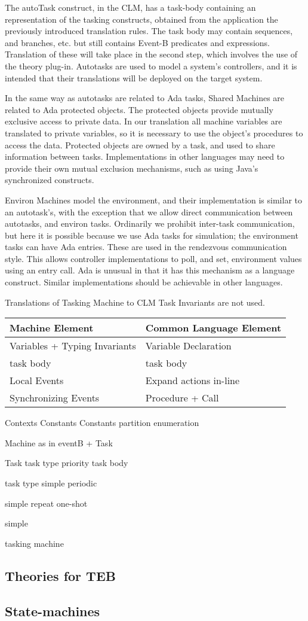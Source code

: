  The autoTask construct, in the CLM, has a task-body containing an representation of the tasking constructs, obtained from the application the previously introduced translation rules. The task body may contain sequences, and branches, etc. but still contains Event-B predicates and expressions. Translation of these will take place in the second step, which involves the use of the theory plug-in. Autotasks are used to model a system's controllers, and it is intended that their translations will be deployed on the target system.

In the same way as autotasks are related to Ada tasks, Shared Machines are related to Ada protected objects. The protected objects provide mutually exclusive access to private data. In our translation all machine variables are translated to private variables, so it is necessary to use the object's procedures to access the data. Protected objects are owned by a task, and used to share information between tasks. Implementations in other languages may need to provide their own mutual exclusion mechanisms, such as using Java's synchronized constructs. 

Environ Machines model the environment, and their implementation is similar to an autotask's, with the exception that we allow direct communication between autotasks, and environ tasks. Ordinarily we prohibit inter-task communication, but here it is possible because we use Ada tasks for simulation; the environment tasks can have Ada entries. These are used in the rendezvous communication style. This allows controller implementations to poll, and set, environment values using an entry call. Ada is unusual in that it has this mechanism as a language construct. Similar implementations should be achievable in other languages.

Translations of Tasking Machine to CLM  Task
Invariants are not used.

\begin{tabular}{l|l}
Machine Element & Common Language Element \\
\hline
Variables + Typing Invariants  &	Variable Declaration\\
\hline
task body & task body\\
Local Events & Expand actions in-line \\
Synchronizing Events & Procedure + Call

\end{tabular}


Contexts
Constants	  Constants
partition		 enumeration

Machine
as in eventB +
Task 

Task 
task type
priority
task body

task type
simple
periodic

simple
repeat
one-shot

simple



tasking machine

\subsection{Theories for TEB}

\subsection{State-machines}
